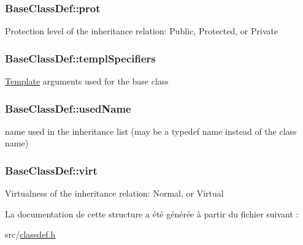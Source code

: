 \subsubsection[{prot}]{ Base\+Class\+Def\+::prot}\label{struct_base_class_def_ab5a986f56300bfa53f7c4cff58196294}
Protection level of the inheritance relation\+: Public, Protected, or Private \hypertarget{struct_base_class_def_a2b8a712d468d70c6c80b5c07f49711ae}{}
\subsubsection[{templ\+Specifiers}]{ Base\+Class\+Def\+::templ\+Specifiers}\label{struct_base_class_def_a2b8a712d468d70c6c80b5c07f49711ae}
\hyperlink{class_template}{Template} arguments used for the base class \hypertarget{struct_base_class_def_ae7703a5a743ee3b6c066d8037fc71f4e}{}
\subsubsection[{used\+Name}]{ Base\+Class\+Def\+::used\+Name}\label{struct_base_class_def_ae7703a5a743ee3b6c066d8037fc71f4e}
name used in the inheritance list (may be a typedef name instead of the class name) \hypertarget{struct_base_class_def_a844100c6fcd90233e01e52fc92107464}{}
\subsubsection[{virt}]{ Base\+Class\+Def\+::virt}\label{struct_base_class_def_a844100c6fcd90233e01e52fc92107464}
Virtualness of the inheritance relation\+: Normal, or Virtual 

La documentation de cette structure a été générée à partir du fichier suivant \+:\begin{DoxyCompactItemize}
\item 
src/\hyperlink{classdef_8h}{classdef.\+h}\end{DoxyCompactItemize}
